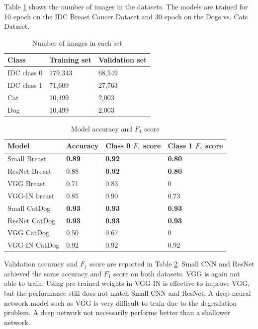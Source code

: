 Table \ref{stats} shows the number of images in the datasets. The models are trained for 10 epoch on the IDC Breast Cancer Dataset and 30 epoch on the Dogs vs. Cats Dataset.
\begin{table}[h]
\centering
\begin{tabular}{ |p{3cm}||p{3cm}|p{3cm}|  }
 \hline
 Class       & Training set & Validation set\\
 \hline
 \hline
 IDC class 0   & 179,343   &  68,549 \\
 IDC class 1  & 71,609  & 27,763\\
 \hline
 Cat   & 10,499  &  2,003\\
 Dog  & 10,499  &  2,003\\
 \hline
\end{tabular}
\caption{Number of images in each set}
\label{stats}
\end{table}


\begin{table}[h]
\centering
\begin{tabular}{ |p{4cm}||p{3cm}|p{3cm}|p{3cm}|  }
 \hline
 Model       & Accuracy & Class 0 $F_1$ score & Class 1 $F_1$ score\\
 \hline
 \hline
 Small Breast   & \textbf{0.89}  & \textbf{0.92} &  \textbf{0.80}\\
 ResNet Breast  & 0.88  & \textbf{0.92} &  \textbf{0.80}\\
 VGG Breast      & 0.71  & 0.83 &  0\\
 VGG-IN breast & 0.85 & 0.90 & 0.73 \\
 \hline
 Small CatDog   & \textbf{0.93}  & \textbf{0.93} &  \textbf{0.93}\\
 ResNet CatDog  & \textbf{0.93}  & \textbf{0.93} &  \textbf{0.93}\\
 VGG CatDog      & 0.50  & 0.67 &  0\\
 VGG-IN CatDog  & 0.92 & 0.92 & 0.92 \\
  \hline
\end{tabular}
\caption{Model accuracy and $F_1$ score}
\label{acctable2}
\end{table}

Validation accuracy and $F_1$ score are reported in Table \ref{acctable2}. Small CNN and ResNet achieved the same accuracy and $F_1$ score on both datasets. VGG is again not able to train. Using pre-trained weights in VGG-IN is effective to improve VGG, but the performance still does not match Small CNN and ResNet. A deep neural network model such as VGG is very difficult to train due to the degradation problem. A deep network not necessarily performs better than a shallower network.

